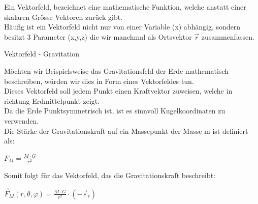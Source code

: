\beginip
Ein Vektorfeld, bezeichnet eine mathematische Funktion, welche anstatt einer skalaren Grösse Vektoren zurück gibt. \\
Häufig ist ein Vektorfeld nicht nur von einer Variable (x) abhängig, sondern besitzt 3 Parameter (x,y,z) die wir manchmal als Ortsvektor $\vec{r}$ zusammenfassen.  \\
\iend

 {Vektorfeld - Gravitation}

\beginbsp
Möchten wir Beispielsweise das Gravitationsfeld der Erde mathematisch beschreiben, würden wir dies in Form eines Vektorfeldes tun. \\
Dieses Vektorfeld soll jedem Punkt einen Kraftvektor zuweisen, welche in richtung Erdmittelpunkt zeigt. \\
Da die Erde Punktsymmetrisch ist, ist es sinnvoll Kugelkoordinaten zu verwenden. \\
Die Stärke der Gravitationskraft auf ein Massepunkt der Masse m ist definiert als:
\begin{center}
	$F_M = \frac{M \cdot G}{r^2}$
\end{center}

Somit folgt für das Vektorfeld, das die Gravitationskraft beschreibt:
\begin{center}
	$\displaystyle \vec{F}_M (r,\theta,\varphi) = \frac{M \cdot G}{r^2} \cdot (- \vec{e}_r)$
\end{center}

\begin{center}

\end{center}
\iend

